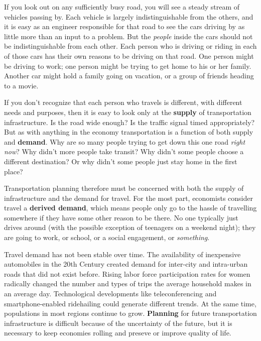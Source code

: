 \documentclass[
]{book}
\begin{document}
If you look out on any sufficiently busy road, you will see a steady stream of
vehicles passing by. Each vehicle is largely indistinguishable from the others,
and it is easy as an engineer responsible for that road to see the cars driving
by as little more than an input to a problem. But the \emph{people} inside the cars
should not be indistinguishable from each other. Each person who is driving or
riding in each of those cars has their own reasons to be driving on that road.
One person might be driving to work; one person might be trying to get home to
his or her family. Another car might hold a family going on vacation, or a group
of friends heading to a movie.

If you don't recognize that each person who travels is different, with different
needs and purposes, then it is easy to look only at the \textbf{supply} of transportation
infrastructure. Is the road wide enough? Is the traffic signal timed appropriately?
But as with anything in the economy transportation is a function of both supply
and \textbf{demand}. Why are so many people trying to get down this one road \emph{right now}?
Why didn't more people take transit? Why didn't some people choose a different
destination? Or why didn't some people just stay home in the first place?

Transportation planning therefore must be concerned with both the supply of
infrastructure and the demand for travel. For the most part, economists consider
travel a \textbf{derived demand}, which means people only go to the hassle of
travelling somewhere if they have some other reason to be there. No one
typically just drives around (with the possible exception of teenagers on a
weekend night); they are going to work, or school, or a social engagement, or
\emph{something}.

Travel demand has not been stable over time. The availability of inexpensive
automobiles in the 20th Century created demand for inter-city and intra-urban
roads that did not exist before. Rising labor force participation rates for
women radically changed the number and types of trips the average household
makes in an average day. Technological developments like teleconferencing and
smartphone-enabled ridehailing could generate different trends. At the same
time, populations in most regions continue to grow. \textbf{Planning} for future
transportation infrastructure is difficult because of the uncertainty of the
future, but it is necessary to keep economies rolling and preseve or improve
quality of life.
\end{document}
